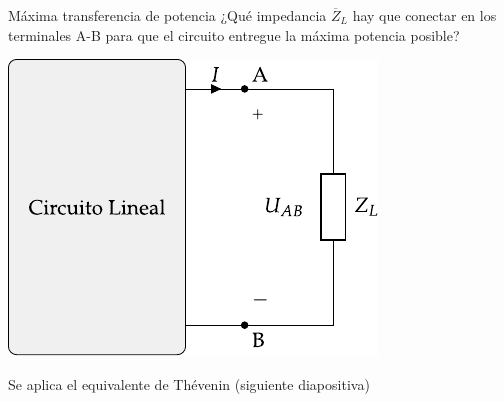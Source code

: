 \documentclass[aspectratio=169, usenames,svgnames,dvipsnames]{beamer}
\begin{document}
\begin{frame}{Máxima transferencia de potencia}
    \vspace{2mm}
    ¿Qué impedancia \(\overline{Z}_L\) hay que conectar en los terminales A-B para que el circuito entregue la \alert{máxima potencia posible}?
    
    \begin{center}
        \includegraphics[height=0.55\textheight]{../figs/EquivalenteThevenin.pdf}
    \end{center}
    
    Se aplica el \alert{equivalente de Thévenin} (siguiente diapositiva)
\end{frame}

\end{document}
